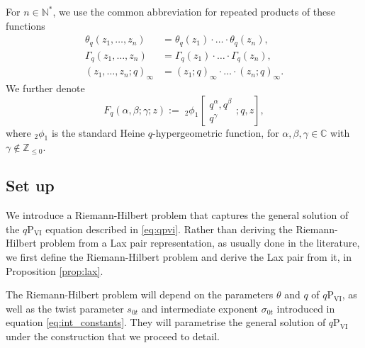 \documentclass[a4paper,reqno,11pt]{amsart}
\numberwithin{equation}{section}
\numberwithin{figure}{section}
\theoremstyle{plain}
\theoremstyle{remark}
\newcommand\Psix{\textrm{P}_{\textrm{VI}}}
\numberwithin{rhp}{section}
\begin{document}
For $n\in\mathbb{N}^*$, we use the common abbreviation for repeated products of these functions 
\begin{align*}
\theta_q(z_1,\ldots,z_n)&=\theta_q(z_1)\cdot \ldots\cdot \theta_q(z_n),\\
\Gamma_q(z_1,\ldots,z_n)&=\Gamma_q(z_1)\cdot\ldots\cdot \Gamma_q(z_n),\\
(z_1,\ldots,z_n;q)_\infty&=(z_1;q)_\infty\cdot\ldots\cdot (z_n;q)_\infty.
\end{align*}
We further denote
\begin{equation}\label{eq:defiFq}
 F_q(\alpha, \beta;\gamma
; z) :=\;_{2}\phi_1 \left[\begin{matrix} 
q^\alpha, q^\beta \\ 
q^\gamma \end{matrix} 
; q,z \right],
\end{equation}
where $_2\phi_1$ is the standard Heine $q$-hypergeometric function, for $\alpha,\beta,\gamma\in\mathbb{C}$ with $\gamma\notin \mathbb{Z}_{\leq 0}$.




\subsection{Set up} \label{subsec:setup}


We introduce a Riemann-Hilbert problem that captures the general solution of the $q\Psix$ equation described in \eqref{eq:qpvi}. Rather than deriving the Riemann-Hilbert problem from a Lax pair representation, as usually done in the literature, we first define the Riemann-Hilbert problem and derive the Lax pair from it, in Proposition \ref{prop:lax}.

The Riemann-Hilbert problem will depend on the parameters $\theta$ and $q$ of $q\Psix$, as well as the twist parameter $s_{0t}$ and intermediate exponent $\sigma_{0t}$ introduced in equation \eqref{eq:int_constants}. They will parametrise the general solution of $q\Psix$ under the construction that we proceed to detail.
\end{document}
